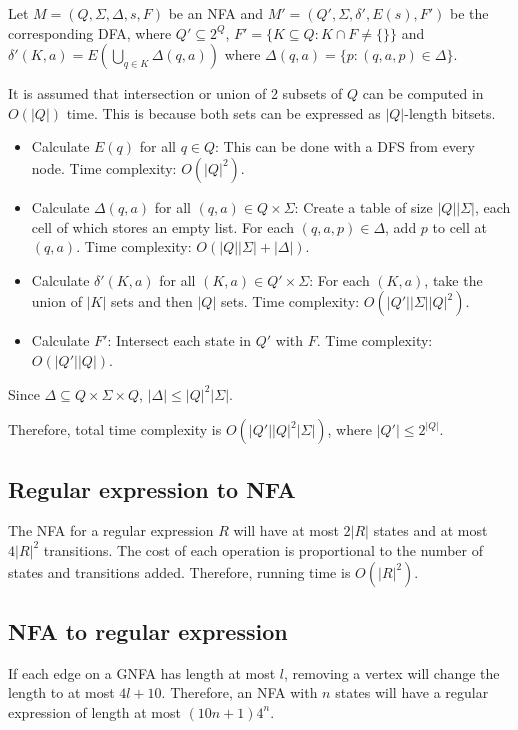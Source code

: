 Let $M = (Q, \Sigma, \Delta, s, F)$ be an NFA
and $M' = (Q', \Sigma, \delta', E(s), F')$ be the corresponding DFA,
where $Q' \subseteq 2^Q$, $F' = \{K \subseteq Q: K \cap F \neq \{\}\}$
and $\delta'(K, a) = E\left(\bigcup_{q \in K} \Delta(q, a) \right)$
where $\Delta(q, a) = \{p: (q, a, p) \in \Delta\}$.

It is assumed that intersection or union of 2 subsets of $Q$
can be computed in $O(|Q|)$ time. This is because both sets
can be expressed as $|Q|$-length bitsets.

\begin{itemize}
\item Calculate $E(q)$ for all $q \in Q$:
    This can be done with a DFS from every node.
    Time complexity: $O(|Q|^2)$.
\item Calculate $\Delta(q, a)$ for all $(q, a) \in Q \times \Sigma$:
    Create a table of size $|Q||\Sigma|$, each cell of which stores an empty list.
    For each $(q, a, p) \in \Delta$, add $p$ to cell at $(q, a)$.
    Time complexity: $O(|Q||\Sigma| + |\Delta|)$.
\item Calculate $\delta'(K, a)$ for all $(K, a) \in Q' \times \Sigma$:
    For each $(K, a)$, take the union of $|K|$ sets and then $|Q|$ sets.
    Time complexity: $O(|Q'||\Sigma||Q|^2)$.
\item Calculate $F'$: Intersect each state in $Q'$ with $F$.
    Time complexity: $O(|Q'||Q|)$.
\end{itemize}

Since $\Delta \subseteq Q \times \Sigma \times Q$, $|\Delta| \le |Q|^2|\Sigma|$.

Therefore, total time complexity is $O(|Q'||Q|^2|\Sigma|)$,
where $|Q'| \le 2^{|Q|}$.

\subsection{Regular expression to NFA}

The NFA for a regular expression $R$ will have at most $2|R|$ states
and at most $4|R|^2$ transitions.
The cost of each operation is proportional to the number of states and transitions added.
Therefore, running time is $O(|R|^2)$.

\subsection{NFA to regular expression}

If each edge on a GNFA has length at most $l$,
removing a vertex will change the length to at most $4l + 10$.
Therefore, an NFA with $n$ states will have a regular expression
of length at most $(10n+1)4^n$.

